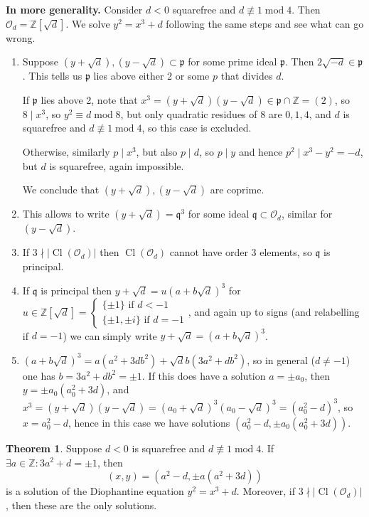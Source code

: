 \documentclass{article}
\newcommand{\Z}{\mathbb{Z}}
\newcommand{\Mod}{\operatorname{mod}}
\newcommand{\Cl}{\operatorname{Cl}}
\newcommand{\ri}{\mathcal{O}}
\newcommand{\ip}{\mathfrak{p}}
\newcommand{\iq}{\mathfrak{q}}
\theoremstyle{definition}
\newtheorem{thm}[defn]{Theorem}
\begin{document}
\textbf{In more generality.} Consider $d<0$ squarefree and $d\not\equiv 1\Mod 4$. Then $\ri_{d}=\Z\left[\sqrt d\right]$. We solve $y^2=x^3+d$ following the same steps and see what can go wrong.
\begin{enumerate}
\item Suppose $\left(y+\sqrt{d}\right),\left(y-\sqrt{d}\right)\subset\ip$ for some prime ideal $\ip$. Then $2\sqrt{-d}\in\ip$. This tells us $\ip$ lies above either 2 or some $p$ that divides $d$.

If $\ip$ lies above 2, note that $x^3=\left(y+\sqrt{d}\right)\left(y-\sqrt{d}\right)\in\ip\cap\Z=(2)$, so $8\mid x^3$, so $y^2\equiv d\Mod 8$, but only quadratic residues of 8 are $0,1,4$, and $d$ is squarefree and $d\not\equiv 1\Mod 4$, so this case is excluded.

Otherwise, similarly $p\mid x^3$, but also $p\mid d$, so $p\mid y$ and hence $p^2\mid x^3-y^2=-d$, but $d$ is squarefree, again impossible.

We conclude that $\left(y+\sqrt{d}\right),\left(y-\sqrt{d}\right)$ are coprime.
\item This allows to write $\left(y+\sqrt{d}\right)=\iq^3$ for some ideal $\iq\subset\ri_d$, similar for $\left(y-\sqrt{d}\right)$.
\item If $3\nmid |\!\Cl(\ri_d)|$ then $\Cl(\ri_d)$ cannot have order 3 elements, so $\iq$ is principal.
\item If $\iq$ is principal then $y+\sqrt d=u\left(a+b\sqrt{d}\right)^3$ for $u\in\Z\left[\sqrt d\right]=\left\{ \begin{aligned}
\{\pm 1\}\text{ if }d< -1 \\ \{\pm 1,\pm i\}\text{ if }d=-1
\end{aligned} \right.$, and again up to signs (and relabelling if $d=-1$) we can simply write $y+\sqrt d=\left(a+b\sqrt{d}\right)^3$.
\item $\left(a+b\sqrt{d}\right)^3=a(a^2+3db^2)+\sqrt{d}b(3a^2+db^2)$, so in general ($d\neq -1$) one has $b=3a^2+db^2=\pm 1$. If this does have a solution $a=\pm a_0$, then $y=\pm a_0(a_0^2+3d)$, and $x^3=\left(y+\sqrt{d}\right)\left(y-\sqrt{d}\right)=\left(a_0+\sqrt{d}\right)^3\left(a_0-\sqrt{d}\right)^3=\left(a_0^2-d\right)^3$, so $x=a_0^2-d$, hence in this case we have solutions $\left(a_0^2-d,\pm a_0\left(a_0^2+3d\right)\right)$.
\end{enumerate}

\begin{thm}
Suppose $d<0$ is squarefree and $d\not\equiv 1\Mod 4$. If $\exists a\in\Z:3a^2+d=\pm 1$, then
\[
(x,y)=\left(a^2-d,\pm a\left(a^2+3d\right)\right)
\]
is a solution of the Diophantine equation $y^2=x^3+d$. Moreover, if $3\nmid|\!\Cl(\ri_d)|$, then these are the only solutions.
\end{thm}
\end{document}
